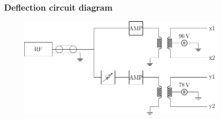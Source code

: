 \documentclass[aspectratio=169]{beamer}
\begin{document}
\begin{frame}
	\frametitle{Deflection circuit diagram}
	\begin{figure}[ht]
		\centering
		\includegraphics[width=0.9\textwidth]{../Figures/Thesis-figure2.pdf}
	\end{figure}
\end{frame}

\end{document}

